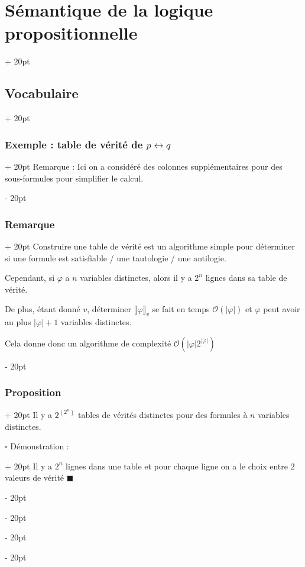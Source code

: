 \documentclass[a4paper, 12pt, twoside]{article}
\newcommand{\abs}[1]{\left\lvert #1 \right\rvert}
\newcommand{\ind}[1][20pt]{\advance\leftskip + #1}
\newcommand{\deind}[1][20pt]{\advance\leftskip - #1}
\newenvironment{indt}[2][20pt]{#2 \par \ind[#1]}{\par \deind} %
\begin{document}
\begin{indt}{\section{Sémantique de la logique propositionnelle}}
\begin{indt}{\subsection{Vocabulaire}}
\begin{indt}{\subsubsection{Exemple : table de vérité de $p \leftrightarrow q$}}
                Remarque : Ici on a considéré des colonnes supplémentaires pour des sous-formules pour simplifier le calcul.
            \end{indt}
            
            \vspace{12pt}
            
            \begin{indt}{\subsubsection{Remarque}}
                Construire une table de vérité est un algorithme simple pour déterminer si une formule est satisfiable / une tautologie / une antilogie.
                
                Cependant, si $\varphi$ a $n$ variables distinctes, alors il y a $2^n$ lignes dans sa table de vérité.
                
                De plus, étant donné $v$, déterminer $\llbracket \varphi \rrbracket_v$ se fait en temps $\mathcal O(\abs \varphi)$ et $\varphi$ peut avoir au plus $\abs\varphi + 1$ variables distinctes.
                
                Cela donne donc un algorithme de complexité $\mathcal O(\abs\varphi 2^{\abs\varphi})$
            \end{indt}
            
            \vspace{12pt}
            
            \begin{indt}{\subsubsection{Proposition}}
                Il y a $2^{(2^n)}$ tables de vérités distinctes pour des formules à $n$ variables distinctes.
                
                \begin{indt}{$\square$ Démonstration :}
                    Il y a $2^n$ lignes dans une table et pour chaque ligne on a le choix entre 2 valeurs de vérité $\blacksquare$
                \end{indt}
            \end{indt}
        \end{indt}
        
        \vspace{12pt}
        

\end{indt}
\end{document}
